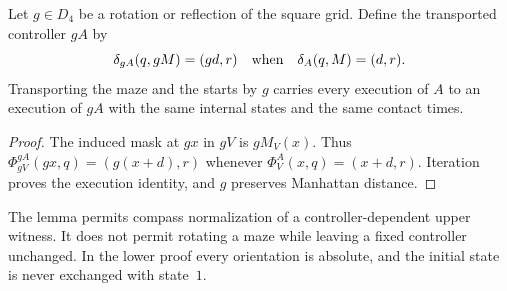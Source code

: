 \begin{lemma}\label{m:transport}
Let $g\in D_4$ be a rotation or reflection of the square grid. Define the transported controller $gA$ by
\[
 \delta_{gA}(q,gM)=(gd,r)\quad\hbox{when}\quad\delta_A(q,M)=(d,r).
\]
Transporting the maze and the starts by $g$ carries every execution of $A$ to an execution of $gA$ with the same internal states and the same contact times.
\end{lemma}
\begin{proof}
The induced mask at $gx$ in $gV$ is $gM_V(x)$. Thus $\Phi_{gV}^{gA}(gx,q)=(g(x+d),r)$ whenever $\Phi_V^A(x,q)=(x+d,r)$. Iteration proves the execution identity, and $g$ preserves Manhattan distance.
\end{proof}

The lemma permits compass normalization of a controller-dependent upper witness. It does not permit rotating a maze while leaving a fixed controller unchanged. In the lower proof every orientation is absolute, and the initial state is never exchanged with state~$1$.
